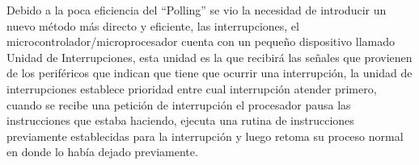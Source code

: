 \documentclass[11pt]{article}
\begin{document}
Debido a la poca eficiencia del “Polling” se vio la necesidad de introducir un nuevo método más directo y eficiente, las interrupciones, el microcontrolador/microprocesador cuenta con un pequeño dispositivo llamado Unidad de Interrupciones, esta unidad es la que recibirá las señales que provienen de los periféricos que indican que tiene que ocurrir una interrupción, la unidad de interrupciones establece prioridad entre cual interrupción atender primero, cuando se recibe una petición de interrupción el procesador pausa las instrucciones que estaba haciendo, ejecuta una rutina de instrucciones previamente establecidas para la interrupción y luego retoma su proceso normal en donde lo había dejado previamente.
\medskip
 
\end{document}
